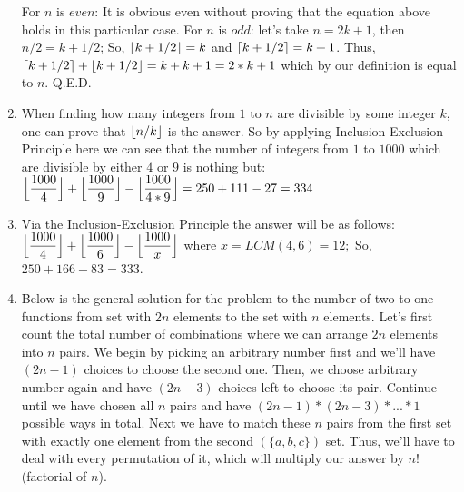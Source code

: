 \documentclass[12pt]{article}
\DeclarePairedDelimiter{\ceil}{\lceil}{\rceil}
\DeclarePairedDelimiter{\floor}{\lfloor}{\rfloor}
\begin{document}
\begin{enumerate}
    For $n$ is $even$: It is obvious even without proving that the equation above holds in this particular case. \newline
    For $n$ is $odd$: let's take $n = 2k + 1$, then $n/2 = k + 1/2$; \newline
    So, $\floor{k + 1/2} = k$ and $\ceil{k + 1/2} = k + 1$. \newline
    Thus, $\ceil{k + 1/2} + \floor{k + 1/2} = k + k + 1 = 2*k + 1$ which by our definition is equal to $n$. \newline Q.E.D.
  \item
    When finding how many integers from $1$ to $n$ are divisible by some integer $k$, one can prove that $\floor{n/k}$ is the answer. \newline \newline
    So by applying Inclusion-Exclusion Principle here we can see that the number of integers from $1$ to $1000$ which are divisible by either $4$ or $9$ is nothing but: \newline
    $\floor[\Big]{\dfrac{1000}{4}} + \floor[\Big]{\dfrac{1000}{9}} - \floor[\Big]{\dfrac{1000}{4*9}} = 250 + 111 - 27 = 334$
  \item
    Via the Inclusion-Exclusion Principle the answer will be as follows: \newline
    $\floor[\Big]{\dfrac{1000}{4}} + \floor[\Big]{\dfrac{1000}{6}} - \floor[\Big]{\dfrac{1000}{x}}$ where $x = LCM(4, 6) = 12;$ \newline \newline
    So, $250 + 166 - 83 = 333$.
  \item
    Below is the general solution for the problem to the number of two-to-one functions from set with $2n$ elements to the set with $n$ elements.
    \newline
    Let's first count the total number of combinations where we can arrange $2n$ elements into $n$ pairs. \newline
    We begin by picking an arbitrary number first and we'll have $(2n - 1)$ choices to choose the second one. Then, we choose arbitrary number again and have $(2n - 3)$ choices left to choose its pair. Continue until we have chosen all $n$ pairs and have $(2n - 1) * (2n - 3) * ... * 1$ possible ways in total.
    \newline Next we have to match these $n$ pairs from the first set with exactly one element from the second $(\{a, b, c\})$ set. Thus, we'll have to deal with every permutation of it, which will multiply our answer by $n!$ (factorial of $n$).

\end{enumerate}
\end{document}
